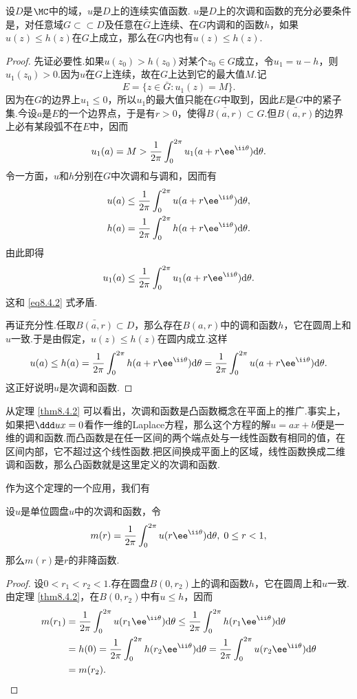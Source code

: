\begin{theorem}\label{thm8.4.2}
设$D$是$\MC$中的域，$u$是$D$上的连续实值函数. $u$是$D$上的次调和函数的充分必要条件是，对任意域$G\subset\subset D$及任意在$\bar G$上连续、在$G$内调和的函数$h$，如果$u(z)\le h(z)$在$G$上成立，那么在$G$内也有$u(z)\le h(z)$.
\end{theorem}
\begin{proof}
先证必要性.如果$u(z_0)>h(z_0)$对某个$z_0\in G$成立，令$u_1=u-h$，则$u_1(z_0)>0$.因为$u$在$G$上连续，故在$G$上达到它的最大值$M$.记
\[E=\{z\in\bar G:u_1(z)=M\}.\]
因为在$G$的边界上$u_1\le0$，所以$u_1$的最大值只能在$G$中取到，因此$E$是$G$中的紧子集.今设$a$是$E$的一个边界点，于是有$r>0$，使得$\bar{B(a,r)}\subset G$.但$\bar{B(a,r)}$的边界上必有某段弧不在$E$中，因而
\begin{equation}\label{eq8.4.2}
u_1(a)=M>\frac1{2\pi}\int_0^{2\pi}u_1(a+r\ee^{\ii\theta})\textrm d\theta.
\end{equation}
令一方面，$u$和$h$分别在$G$中次调和与调和，因而有
\begin{align*}
&u(a)\le\frac1{2\pi}\int_0^{2\pi}u(a+r\ee^{\ii\theta})\textrm d\theta,\\
&h(a)=\frac1{2\pi}\int_0^{2\pi}h(a+r\ee^{\ii\theta})\textrm d\theta.
\end{align*}
由此即得
\[u_1(a)\le\frac1{2\pi}\int_0^{2\pi}u_1(a+r\ee^{\ii\theta})\textrm d\theta.\]
这和 \eqref{eq8.4.2} 式矛盾.

再证充分性.任取$\bar{B(a,r)}\subset D$，那么存在$B(a,r)$中的调和函数$h$，它在圆周上和$u$一致.于是由假定，$u(z)\le h(z)$在圆内成立.这样
\[u(a)\le h(a)=\frac1{2\pi}\int_0^{2\pi}h(a+r\ee^{\ii\theta})\textrm d\theta
=\frac1{2\pi}\int_0^{2\pi}u(a+r\ee^{\ii\theta})\textrm d\theta.\]
这正好说明$u$是次调和函数.
\end{proof}

从定理 \ref{thm8.4.2} 可以看出，次调和函数是凸函数概念在平面上的推广.事实上，如果把$\ddd ux=0$看作一维的Laplace方程，那么这个方程的解$u=ax+b$便是一维的调和函数.而凸函数是在任一区间的两个端点处与一线性函数有相同的值，在区间内部，它不超过这个线性函数.把区间换成平面上的区域，线性函数换成二维调和函数，那么凸函数就是这里定义的次调和函数.

作为这个定理的一个应用，我们有
\begin{theorem}\label{thm8.4.3}
设$u$是单位圆盘$u$中的次调和函数，令
\[m(r)=\frac1{2\pi}\int_0^{2\pi}u(r\ee^{\ii\theta})\textrm d\theta,\;0\le r<1,\]
那么$m(r)$是$r$的非降函数.
\end{theorem}
\begin{proof}
设$0<r_1<r_2<1$.存在圆盘$B(0,r_2)$上的调和函数$h$，它在圆周上和$u$一致.由定理 \ref{thm8.4.2}，在$B(0,r_2)$中有$u\le h$，因而
\begin{align*}
m(r_1)&=\frac1{2\pi}\int_0^{2\pi}u(r_1\ee^{\ii\theta})\textrm d\theta
\le\frac1{2\pi}\int_0^{2\pi}h(r_1\ee^{\ii\theta})\textrm d\theta\\
&=h(0)=\frac1{2\pi}\int_0^{2\pi}h(r_2\ee^{\ii\theta})\textrm d\theta
=\frac1{2\pi}\int_0^{2\pi}u(r_2\ee^{\ii\theta})\textrm d\theta\\
&=m(r_2).
\end{align*}
\end{proof}

